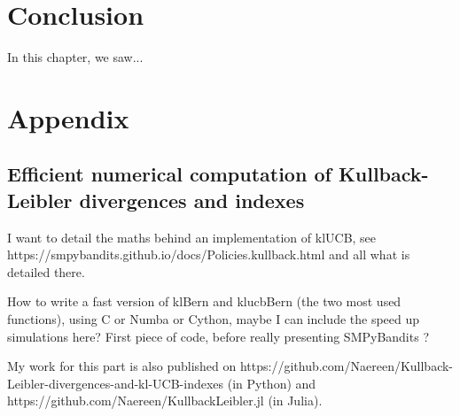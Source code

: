 \section{Conclusion}
\label{sec:2:conclusion}

In this chapter, we saw...




\section{Appendix}
\label{sec:2:appendix}


\subsection{Efficient numerical computation of Kullback-Leibler divergences and \klUCB{} indexes}

I want to detail the maths behind an implementation of klUCB, see https://smpybandits.github.io/docs/Policies.kullback.html and all what is detailed there.

How to write a fast version of klBern and klucbBern (the two most used functions), using C or Numba or Cython, maybe I can include the speed up simulations here? First piece of code, before really presenting SMPyBandits ?

My work for this part is also published on https://github.com/Naereen/Kullback-Leibler-divergences-and-kl-UCB-indexes
(in Python) and https://github.com/Naereen/KullbackLeibler.jl (in Julia).

